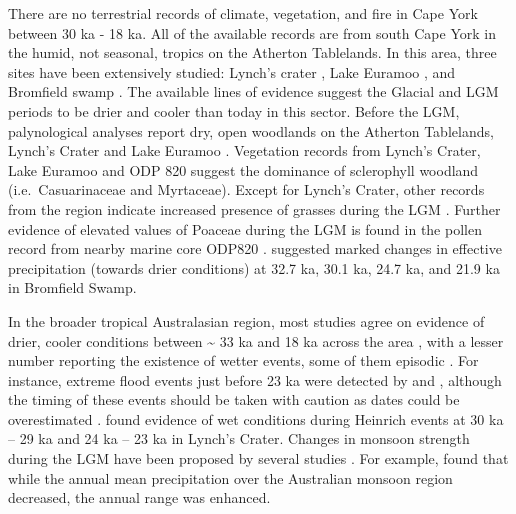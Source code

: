 \documentclass[
  12pt,
]{book}
\begin{document}
There are no terrestrial records of climate, vegetation, and fire in Cape York between 30 ka - 18 ka. All of the available records are from south Cape York in the humid, not seasonal, tropics on the Atherton Tablelands. In this area, three sites have been extensively studied: Lynch's crater \citep{kershawCompletePollenRecord2007, turneyGeochemicalChangesRecorded2006a, turneyMillennialOrbitalVariations2004a}, Lake Euramoo \citep{haberle23000yrPollen2005}, and Bromfield swamp \citep{burrowsNewLateQuaternary2016a}. The available lines of evidence suggest the Glacial and LGM periods to be drier and cooler than today in this sector. Before the LGM, palynological analyses report dry, open woodlands on the Atherton Tablelands, Lynch's Crater and Lake Euramoo \citep{turneyMillennialOrbitalVariations2004a, kershawPleistoceneVegetationHumid1994}. Vegetation records from Lynch's Crater, Lake Euramoo \citep{haberle23000yrPollen2005} and ODP 820 \citep{mossLateQuaternaryMarine2007} suggest the dominance of sclerophyll woodland (i.e.~Casuarinaceae and Myrtaceae). Except for Lynch's Crater, other records from the region indicate increased presence of grasses during the LGM \citep{petherickClimaticEnvironmentalVariability2011}. Further evidence of elevated values of Poaceae during the LGM is found in the pollen record from nearby marine core ODP820 \citep{mossLateQuaternaryMarine2007}. \citet{burrowsNewLateQuaternary2016a} suggested marked changes in effective precipitation (towards drier conditions) at 32.7 ka, 30.1 ka, 24.7 ka, and 21.9 ka in Bromfield Swamp.

In the broader tropical Australasian region, most studies agree on evidence of drier, cooler conditions between \textasciitilde{} 33 ka and 18 ka across the area \citep{dennistonNorthAtlanticForcing2013, dinezioEffectSeaLevel2013a, reevesPalaeoenvironmentalChangeTropical2013}, with a lesser number reporting the existence of wetter events, some of them episodic \citep{nott30000Year1996, mullerPossibleEvidenceWet2008a, burrowsNewLateQuaternary2016a, dennistonDecouplingMonsoonActivity2017}. For instance, extreme flood events just before 23 ka were detected by \citet{nott30000Year1996} and \citet{nottWaterfallsFloodsClimate1999}, although the timing of these events should be taken with caution as dates could be overestimated \citep{mayRefiningLateQuaternary2015}. \citet{mullerPossibleEvidenceWet2008a} found evidence of wet conditions during Heinrich events at 30 ka -- 29 ka and 24 ka -- 23 ka in Lynch's Crater. Changes in monsoon strength during the LGM have been proposed by several studies \citep{jiangConceptGlobalMonsoon2015, dennistonDecouplingMonsoonActivity2017, yanUnderstandingAustralianMonsoon2018}. For example, \citet{yanUnderstandingAustralianMonsoon2018} found that while the annual mean precipitation over the Australian monsoon region decreased, the annual range was enhanced.
\end{document}

